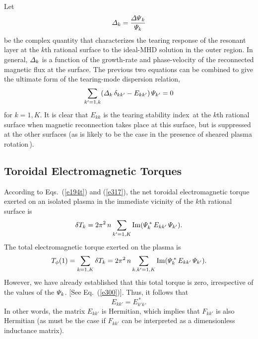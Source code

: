 \documentclass[12pt,prb,aps]{revtex4-1}
\begin{document}
Let
\begin{equation}\label{e403}
{\mit\Delta}_k = \frac{{\mit\Delta\Psi}_k}{{\mit\Psi}_k}
\end{equation}
 be the complex quantity that characterizes the
tearing response of the resonant layer at the $k$th rational surface to the ideal-MHD solution in the outer region.\cite{fkr}
In general, ${\mit\Delta}_k$ is a function of the growth-rate and phase-velocity of the reconnected magnetic flux at the surface.\cite{am1,layer,layer1}
The previous two equations can be combined to give the ultimate form of the  tearing-mode dispersion relation,
\begin{equation}\label{e317u}
\sum_{k'=1,k}({\mit\Delta}_k\,\delta_{kk'}-E_{kk'})\,{\mit\Psi}_{k'} = 0
\end{equation}
for $k=1,K$. It is clear that $E_{kk}$ is the tearing stability index\,\cite{fkr} at the $k$th rational surface when magnetic reconnection  takes place
at this surface, but is suppressed at the other surfaces (as is likely to be the case in the presence of sheared plasma rotation\,\cite{am1}). 

\subsection{Toroidal Electromagnetic Torques}
According to Eqs.~(\ref{e194t}) and (\ref{e317}), the net toroidal electromagnetic torque exerted on an isolated plasma
in the immediate vicinity of the $k$th rational surface is
\begin{equation}\label{e405}
\delta T_k = 2\pi^2\,n\sum_{k'=1,K} {\rm Im}({\mit\Psi}_k^{\,\ast}\,E_{kk'}\,{\mit\Psi}_{k'}).
\end{equation}
The total electromagnetic torque exerted on the plasma is
\begin{equation}
T_\phi(1) = \sum_{k=1,K}\delta T_k =  2\pi^2\,n\sum_{k,k'=1,K} {\rm Im}({\mit\Psi}_k^{\,\ast}\,E_{kk'}\,{\mit\Psi}_{k'}).
\end{equation}
However, we have already established that this total torque is zero, irrespective of the values of the ${\mit\Psi}_k$. [See Eq.~(\ref{e300})].
Thus, it follows that
\begin{equation}
E_{kk'} = E_{k'k}^{\,\ast}.
\end{equation}
In other words, the matrix $E_{kk'}$ is Hermitian,\cite{am1} which implies that $F_{kk'}$ is also Hermitian (as must  be the case if $F_{kk'}$ can
be interpreted as 
a dimensionless inductance matrix). 
\end{document}
